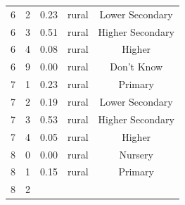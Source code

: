 \documentclass[stu, 12pt, floatsintext,longtable]{apa7}
\begin{document}
\begin{longtable}{ccccc}
    \\
    6                                                  & 2                    &
    0.23                                               &
    rural                                              & Lower Secondary
    \\
    6                                                  & 3                    &
    0.51                                               &
    rural                                              & Higher Secondary
    \\
    6                                                  & 4                    &
    0.08                                               &
    rural                                              & Higher
    \\
    6                                                  & 9                    &
    0.00                                               &
    rural                                              & Don't Know
    \\
    7                                                  & 1                    &
    0.23                                               &
    rural                                              & Primary
    \\
    7                                                  & 2                    &
    0.19                                               &
    rural                                              & Lower Secondary
    \\
    7                                                  & 3                    &
    0.53                                               &
    rural                                              & Higher Secondary
    \\
    7                                                  & 4                    &
    0.05                                               &
    rural                                              & Higher
    \\
    8                                                  & 0                    &
    0.00                                               &
    rural                                              & Nursery
    \\
    8                                                  & 1                    &
    0.15                                               &
    rural                                              & Primary
    \\
    8                                                  & 2                    &

\end{longtable}
\end{document}
